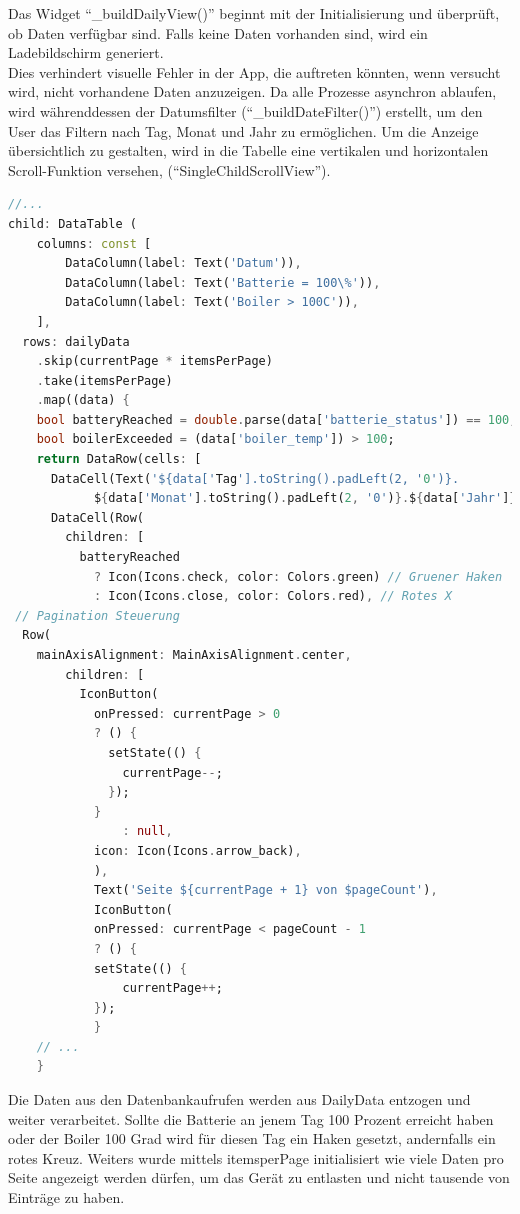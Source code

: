 \documentclass[11pt]{scrartcl}
\begin{document}
    Das Widget \enquote{\_buildDailyView()} beginnt mit der Initialisierung und überprüft, ob Daten verfügbar sind.
    Falls keine Daten vorhanden sind, wird ein Ladebildschirm generiert. \\
    Dies verhindert visuelle Fehler in der App, die auftreten könnten, wenn versucht wird, nicht vorhandene Daten anzuzeigen.
    Da alle Prozesse asynchron ablaufen, wird währenddessen der Datumsfilter (\enquote{\_buildDateFilter()}) erstellt,
    um den User das Filtern nach Tag, Monat und Jahr zu ermöglichen.
    Um die Anzeige übersichtlich zu gestalten, wird in die Tabelle eine vertikalen und horizontalen
    Scroll-Funktion versehen, (\enquote{SingleChildScrollView}).
    \begin{lstlisting}[language=Dart]
      //...
child: DataTable (
    columns: const [
        DataColumn(label: Text('Datum')),
        DataColumn(label: Text('Batterie = 100\%')),
        DataColumn(label: Text('Boiler > 100C')),
    ],
  rows: dailyData
    .skip(currentPage * itemsPerPage)
    .take(itemsPerPage)
    .map((data) {
    bool batteryReached = double.parse(data['batterie_status']) == 100;
    bool boilerExceeded = (data['boiler_temp']) > 100;
    return DataRow(cells: [
      DataCell(Text('${data['Tag'].toString().padLeft(2, '0')}.
            ${data['Monat'].toString().padLeft(2, '0')}.${data['Jahr']}')),
      DataCell(Row(
        children: [
          batteryReached
            ? Icon(Icons.check, color: Colors.green) // Gruener Haken
            : Icon(Icons.close, color: Colors.red), // Rotes X
 // Pagination Steuerung
  Row(
    mainAxisAlignment: MainAxisAlignment.center,
        children: [
          IconButton(
            onPressed: currentPage > 0
            ? () {
              setState(() {
                currentPage--;
              });
            }
                : null,
            icon: Icon(Icons.arrow_back),
            ),
            Text('Seite ${currentPage + 1} von $pageCount'),
            IconButton(
            onPressed: currentPage < pageCount - 1
            ? () {
            setState(() {
                currentPage++;
            });
            }
    // ...
    }
    \end{lstlisting}
    Die Daten aus den Datenbankaufrufen werden aus DailyData entzogen und weiter verarbeitet. Sollte die Batterie an
    jenem Tag 100 Prozent erreicht haben oder der Boiler 100 Grad wird für diesen Tag ein Haken gesetzt,
    andernfalls ein rotes Kreuz. Weiters wurde mittels itemsperPage initialisiert wie viele Daten pro Seite
    angezeigt werden dürfen, um das Gerät zu entlasten und nicht tausende von Einträge zu haben.
\end{document}
